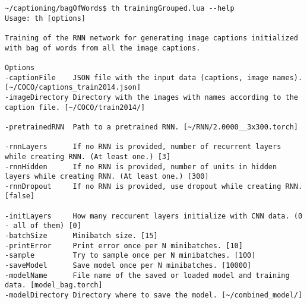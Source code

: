 \begin{lstlisting}[firstnumber=1,breakindent=75pt]
~/captioning/bagOfWords$ th trainingGrouped.lua --help
Usage: th [options] 

Training of the RNN network for generating image captions initialized with bag of words from all the image captions.

Options
-captionFile    JSON file with the input data (captions, image names). [~/COCO/captions_train2014.json]
-imageDirectory Directory with the images with names according to the caption file. [~/COCO/train2014/]

-pretrainedRNN  Path to a pretrained RNN. [~/RNN/2.0000__3x300.torch]

-rnnLayers      If no RNN is provided, number of recurrent layers while creating RNN. (At least one.) [3]
-rnnHidden      If no RNN is provided, number of units in hidden layers while creating RNN. (At least one.) [300]
-rnnDropout     If no RNN is provided, use dropout while creating RNN. [false]

-initLayers     How many reccurent layers initialize with CNN data. (0 - all of them) [0]
-batchSize      Minibatch size. [15]
-printError     Print error once per N minibatches. [10]
-sample         Try to sample once per N minibatches. [100]
-saveModel      Save model once per N minibatches. [10000]
-modelName      File name of the saved or loaded model and training data. [model_bag.torch]
-modelDirectory Directory where to save the model. [~/combined_model/]
\end{lstlisting}


